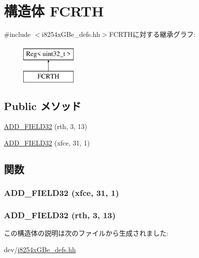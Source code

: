\hypertarget{structiGbReg_1_1Regs_1_1FCRTH}{
\section{構造体 FCRTH}
\label{structiGbReg_1_1Regs_1_1FCRTH}
}


{\ttfamily \#include $<$i8254xGBe\_\-defs.hh$>$}FCRTHに対する継承グラフ:\begin{figure}[H]
\begin{center}
\leavevmode
\includegraphics[height=2cm]{structiGbReg_1_1Regs_1_1FCRTH}
\end{center}
\end{figure}
\subsection*{Public メソッド}
\begin{DoxyCompactItemize}
\item 
\hyperlink{structiGbReg_1_1Regs_1_1FCRTH_a91a77e5e460fca8494d437ab81da1ecd}{ADD\_\-FIELD32} (rth, 3, 13)
\item 
\hyperlink{structiGbReg_1_1Regs_1_1FCRTH_a4fc08a1597eabc3192047f250b592c69}{ADD\_\-FIELD32} (xfce, 31, 1)
\end{DoxyCompactItemize}


\subsection{関数}
\hypertarget{structiGbReg_1_1Regs_1_1FCRTH_a4fc08a1597eabc3192047f250b592c69}{
\subsubsection[{ADD\_\-FIELD32}]{\setlength{\rightskip}{0pt plus 5cm}ADD\_\-FIELD32 (xfce, \/  31, \/  1)}}
\label{structiGbReg_1_1Regs_1_1FCRTH_a4fc08a1597eabc3192047f250b592c69}
\hypertarget{structiGbReg_1_1Regs_1_1FCRTH_a91a77e5e460fca8494d437ab81da1ecd}{
\subsubsection[{ADD\_\-FIELD32}]{\setlength{\rightskip}{0pt plus 5cm}ADD\_\-FIELD32 (rth, \/  3, \/  13)}}
\label{structiGbReg_1_1Regs_1_1FCRTH_a91a77e5e460fca8494d437ab81da1ecd}


この構造体の説明は次のファイルから生成されました:\begin{DoxyCompactItemize}
\item 
dev/\hyperlink{i8254xGBe__defs_8hh}{i8254xGBe\_\-defs.hh}\end{DoxyCompactItemize}
